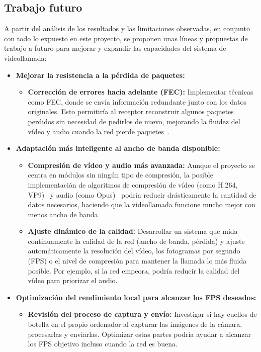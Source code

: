 \newpage

\subsection{Trabajo futuro}
A partir del análisis de los resultados y las limitaciones observadas, en conjunto con todo lo expuesto en este proyecto, se proponen unas líneas y propuestas de trabajo a futuro para mejorar y expandir las capacidades del sistema de videollamada:

\begin{itemize}
\item \textbf{Mejorar la resistencia a la pérdida de paquetes:}
\begin{itemize}
\item \textbf{Corrección de errores hacia adelante (FEC):} Implementar técnicas como FEC, donde se envía información redundante junto con los datos originales. Esto permitiría al receptor reconstruir algunos paquetes perdidos sin necesidad de pedirlos de nuevo, mejorando la fluidez del vídeo y audio cuando la red pierde paquetes~\cite{fec}.
\end{itemize}
\item \textbf{Adaptación más inteligente al ancho de banda disponible:}
\begin{itemize}
    \item \textbf{Compresión de vídeo y audio más avanzada:} Aunque el proyecto se centra en módulos sin ningún tipo de compresión, la posible implementación de algoritmos de compresión de vídeo (como H.264, VP9)~\cite{h264} y audio (como Opus)~\cite{opus} podría reducir drásticamente la cantidad de datos necesarios, haciendo que la videollamada funcione mucho mejor con menos ancho de banda.
    \item \textbf{Ajuste dinámico de la calidad:} Desarrollar un sistema que mida continuamente la calidad de la red (ancho de banda, pérdida) y ajuste automáticamente la resolución del vídeo, los fotogramas por segundo (FPS) o el nivel de compresión para mantener la llamada lo más fluida posible. Por ejemplo, si la red empeora, podría reducir la calidad del vídeo para priorizar el audio.
\end{itemize}

\item \textbf{Optimización del rendimiento local para alcanzar los FPS deseados:}
\begin{itemize}
    \item \textbf{Revisión del proceso de captura y envío:} Investigar si hay cuellos de botella en el propio ordenador al capturar las imágenes de la cámara, procesarlas y enviarlas. Optimizar estas partes podría ayudar a alcanzar los FPS objetivo incluso cuando la red es buena.
\end{itemize}


\end{itemize}
